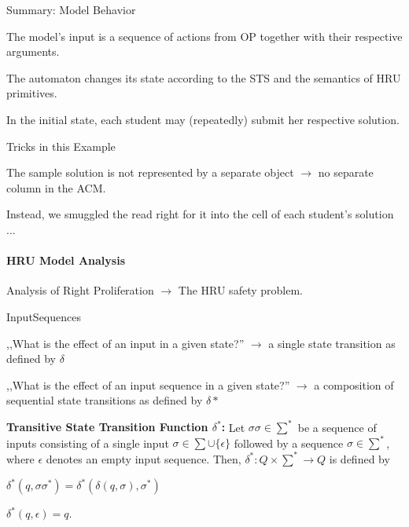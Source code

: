 \documentclass[a4paper]{article}
\renewcommand{\note}[2]{\begin{noteBox} \textbf{#1} #2 \end{noteBox}}
\begin{document}
\begin{multicols}{3}
    Summary: Model Behavior
    \begin{itemize*}
        \item The model’s input is a sequence of actions from OP together with their respective arguments.
        \item The automaton changes its state according to the STS and the semantics of HRU primitives.
        \item In the initial state, each student may (repeatedly) submit her respective solution.
    \end{itemize*}
    Tricks in this Example
    \begin{itemize*}
        \item The sample solution is not represented by a separate object $\rightarrow$ no separate column in the ACM.
        \item Instead, we smuggled the read right for it into the cell of each student’s solution ...
    \end{itemize*}

    \paragraph{HRU Model Analysis}
    Analysis of Right Proliferation $\rightarrow$ The HRU safety problem.

    InputSequences
    \begin{itemize*}
        \item ,,What is the effect of an input in a given state?'' $\rightarrow$ a single state transition as defined by $\delta$
        \item ,,What is the effect of an input sequence in a given state?'' $\rightarrow$ a composition of sequential state transitions as defined by $\delta*$
    \end{itemize*}

    \note{Transitive State Transition Function $\delta^*$:}{Let $\sigma\sigma\in\sum^*$ be a sequence of inputs consisting of a single input $\sigma\in\sum\cup\{\epsilon\}$ followed by a sequence $\sigma\in\sum^*$, where $\epsilon$ denotes an empty input sequence. Then, $\delta^*:Q\times\sum^*\rightarrow Q$ is defined by
        \begin{itemize*}
            \item $\delta^*(q,\sigma\sigma^*)=\delta^*(\delta(q,\sigma),\sigma^*)$
            \item $\delta^*(q,\epsilon)=q$.
        \end{itemize*}
    }


\end{multicols}
\end{document}
